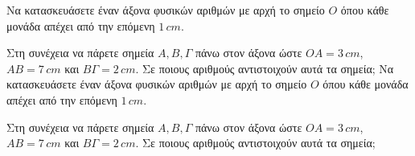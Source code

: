 Να κατασκευάσετε έναν άξονα φυσικών αριθμών με αρχή το σημείο $ O $ όπου κάθε μονάδα απέχει από την επόμενη $ 1\,cm $.
\begin{center}
\end{center}
Στη συνέχεια να πάρετε σημεία $ A,B,\varGamma $ πάνω στον άξονα ώστε $ OA=3\,cm $, $ AB=7\,cm $ και $ B\varGamma=2\,cm $. Σε ποιους αριθμούς αντιστοιχούν αυτά τα σημεία;
Να κατασκευάσετε έναν άξονα φυσικών αριθμών με αρχή το σημείο $ O $ όπου κάθε μονάδα απέχει από την επόμενη $ 1\,cm $.
\begin{center}
\end{center}
Στη συνέχεια να πάρετε σημεία $ A,B,\varGamma $ πάνω στον άξονα ώστε $ OA=3\,cm $, $ AB=7\,cm $ και $ B\varGamma=2\,cm $. Σε ποιους αριθμούς αντιστοιχούν αυτά τα σημεία;
